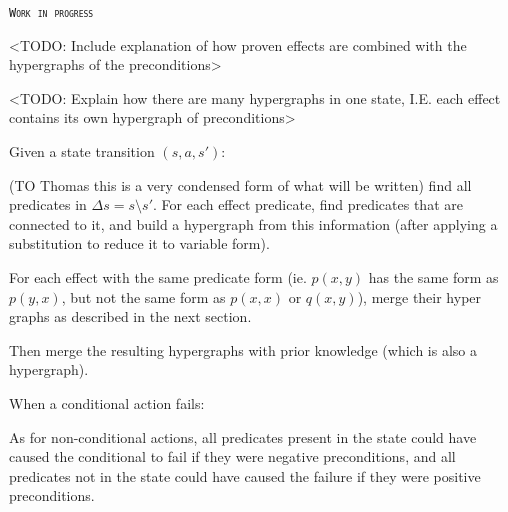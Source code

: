 \documentclass[../Master.tex]{subfiles}
\begin{document}
\textsc{\texttt{Work in progress}}

<TODO: Include explanation of how proven effects are combined with the hypergraphs of the preconditions>

<TODO: Explain how there are many hypergraphs in one state, I.E. each effect contains its own hypergraph of preconditions>

Given a state transition $(s,a,s')$:

(TO Thomas this is a very condensed form of what will be written)
find all predicates in $\Delta s = s \setminus s'$. For each effect predicate, find predicates that are connected to it, and build a hypergraph from this information (after applying a substitution to reduce it to variable form). 

For each effect with the same predicate form (ie. $p(x,y)$ has the same form as $p(y,x)$, but not the same form as $p(x,x)$ or $q(x,y)$), merge their hyper graphs as described in the next section. 

Then merge the resulting hypergraphs with prior knowledge (which is also a hypergraph).

When a conditional action fails:

As for non-conditional actions, all predicates present in the state could have caused the conditional to fail if they were negative preconditions, and all predicates not in the state could have caused the failure if they were positive preconditions.
\end{document}
